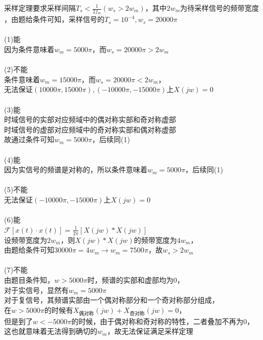 \documentclass[answers]{exam}
\begin{document}
\begin{solution}
	采样定理要求采样间隔$T_s<\frac{1}{2f_m}(w_s>2w_m)$，其中$2w_m$为待采样信号的频带宽度
	，由题给条件可知，采样信号的$T_s=10^{-4},w_s=20000\pi$\\
	~\\
	(1)能\\
	因为条件意味着$w_m=5000\pi$，而$w_s=20000\pi>2w_m$\\
	~\\
	(2)不能\\
	条件意味着$w_m=15000\pi$，而$w_s=20000\pi<2w_m$，\\无法保证$(10000\pi,15000\pi),(-10000\pi,-15000\pi)$上$X(jw)=0$\\
	~\\
	(3)能\\
	时域信号的实部对应频域中的偶对称实部和奇对称虚部\\
	时域信号的虚部对应频域中的奇对称实部和偶对称虚部\\
	故通过条件可知$w_m=5000\pi$，后续同(1)\\
	~\\
	(4)能\\
	因为实信号的频谱是对称的，所以条件意味着$w_m=5000\pi$，后续同(1)\\
	~\\
	(5)不能\\
	无法保证$(-10000\pi,-15000\pi)$上$X(jw)=0$\\
	~\\
	(6)能\\
	$\mathcal{F}[x(t)\cdot x(t)]=\frac{1}{2\pi}[X(jw)*X(jw)]$\\
	设频带宽度为$2w_m$，则$X(jw)*X(jw)$的频带宽度为$4w_m$，\\
	由题给条件可知$30000\pi=4w_m\rightarrow w_m=7500\pi$，故$w_s>2w_m$\\
	~\\
	(7)不能\\
	由题目条件知，$w>5000\pi$时，频谱的实部和虚部均为0，\\
	对于实信号，显然有$w_m=5000\pi$\\
	对于复信号，其频谱实部由一个偶对称部分和一个奇对称部分组成，\\
	在$w>5000\pi$的时候有$X_{\mbox{偶对称}}(jw)+X_{\mbox{奇对称}}(jw)=0$，\\
	但是到了$w<-5000\pi$的时候，由于偶对称和奇对称的特性，二者叠加不再为0，
	这也就意味着无法得到确切的$w_m$，故无法保证满足采样定理
\end{solution}
\end{document}
